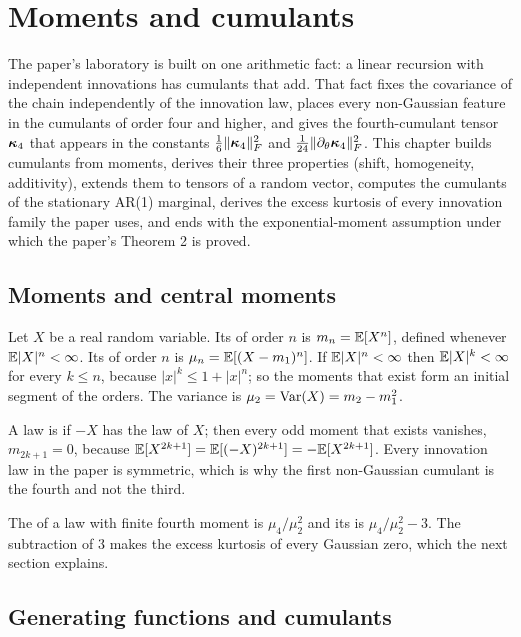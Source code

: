 \chapter{Moments and cumulants}
\label{ch:moments-cumulants}

The paper's laboratory is built on one arithmetic fact: a linear recursion with
independent innovations has cumulants that add. That fact fixes the covariance of
the chain independently of the innovation law, places every non-Gaussian feature in
the cumulants of order four and higher, and gives the fourth-cumulant tensor $\bm{\kappa}_4$
that appears in the constants $\tfrac16\lVert \bm{\kappa}_4 \rVert_{F}^2$ and $\tfrac1{24}\lVert \partial_\theta\bm{\kappa}_4 \rVert_{F}^2$.
This chapter builds cumulants from moments, derives their three properties (shift,
homogeneity, additivity), extends them to tensors of a random vector, computes the
cumulants of the stationary AR(1) marginal, derives the excess kurtosis of every
innovation family the paper uses, and ends with the exponential-moment assumption
under which the paper's Theorem 2 is proved.

\section{Moments and central moments}

Let $X$ be a real random variable. Its  of order $n$ is
$m_n=\mathbb{E}[X^n]$, defined whenever $\mathbb{E}|X|^n<\infty$. Its  of order
$n$ is $\mu_n=\mathbb{E}[(X-m_1)^n]$. If $\mathbb{E}|X|^n<\infty$ then $\mathbb{E}|X|^k<\infty$ for every
$k\le n$, because $|x|^k\le1+|x|^n$; so the moments that exist form an initial segment
of the orders. The variance is $\mu_2=\operatorname{Var}(X)=m_2-m_1^2$.

A law is  if $-X$ has the law of $X$; then every odd moment that
exists vanishes, $m_{2k+1}=0$, because $\mathbb{E}[X^{2k+1}]=\mathbb{E}[(-X)^{2k+1}]=-\mathbb{E}[X^{2k+1}]$.
Every innovation law in the paper is symmetric, which is why the first non-Gaussian
cumulant is the fourth and not the third.

The  of a law with finite fourth moment is $\mu_4/\mu_2^2$ and its
 is $\mu_4/\mu_2^2-3$. The subtraction of $3$ makes the excess
kurtosis of every Gaussian zero, which the next section explains.

\section{Generating functions and cumulants}

